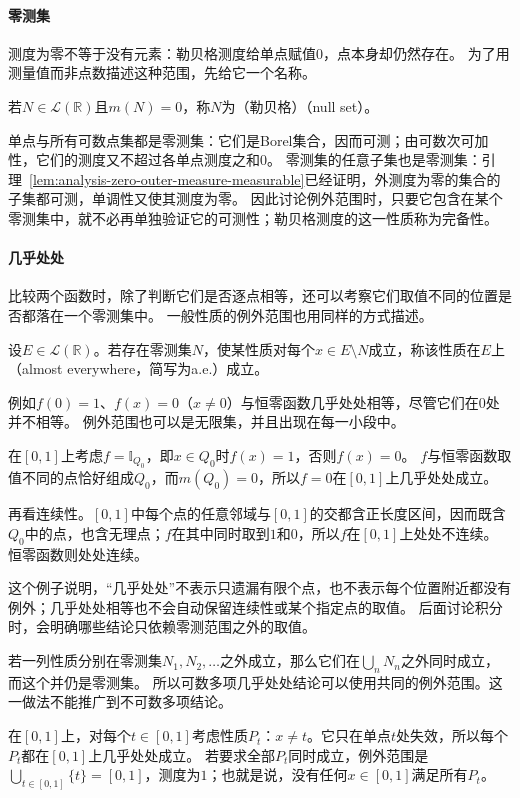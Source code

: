 \paragraph{零测集}

测度为零不等于没有元素：勒贝格测度给单点赋值$0$，点本身却仍然存在。
为了用测量值而非点数描述这种范围，先给它一个名称。
\begin{definition}[零测集]
\label{def:analysis-null-set-almost-everywhere}
若$N\in\mathcal L(\mathbb R)$且$m(N)=0$，称$N$为（勒贝格）（null set）。
\end{definition}
单点与所有可数点集都是零测集：它们是Borel集合，因而可测；由可数次可加性，它们的测度又不超过各单点测度之和$0$。
零测集的任意子集也是零测集：引理~\ref{lem:analysis-zero-outer-measure-measurable}已经证明，外测度为零的集合的子集都可测，单调性又使其测度为零。
因此讨论例外范围时，只要它包含在某个零测集中，就不必再单独验证它的可测性；勒贝格测度的这一性质称为完备性。

\paragraph{几乎处处}

比较两个函数时，除了判断它们是否逐点相等，还可以考察它们取值不同的位置是否都落在一个零测集中。
一般性质的例外范围也用同样的方式描述。
\begin{definition}[几乎处处]
设$E\in\mathcal L(\mathbb R)$。若存在零测集$N$，使某性质对每个$x\in E\setminus N$成立，称该性质在$E$上（almost everywhere，简写为a.e.）成立。
\end{definition}
例如$f(0)=1$、$f(x)=0$（$x\neq0$）与恒零函数几乎处处相等，尽管它们在$0$处并不相等。
例外范围也可以是无限集，并且出现在每一小段中。
\begin{example}[有理点指示函数几乎处处为零]
在$[0,1]$上考虑$f=\mathbb I_{Q_0}$，即$x\in Q_0$时$f(x)=1$，否则$f(x)=0$。
$f$与恒零函数取值不同的点恰好组成$Q_0$，而$m(Q_0)=0$，所以$f=0$在$[0,1]$上几乎处处成立。

再看连续性。$[0,1]$中每个点的任意邻域与$[0,1]$的交都含正长度区间，因而既含$Q_0$中的点，也含无理点；$f$在其中同时取到$1$和$0$，所以$f$在$[0,1]$上处处不连续。
恒零函数则处处连续。
\end{example}

这个例子说明，“几乎处处”不表示只遗漏有限个点，也不表示每个位置附近都没有例外；几乎处处相等也不会自动保留连续性或某个指定点的取值。
后面讨论积分时，会明确哪些结论只依赖零测范围之外的取值。

若一列性质分别在零测集$N_1,N_2,\ldots$之外成立，那么它们在$\bigcup_nN_n$之外同时成立，而这个并仍是零测集。
所以可数多项几乎处处结论可以使用共同的例外范围。这一做法不能推广到不可数多项结论。
\begin{example}[不可数多项几乎处处结论不能合并]
在$[0,1]$上，对每个$t\in[0,1]$考虑性质$P_t$：$x\neq t$。它只在单点$t$处失效，所以每个$P_t$都在$[0,1]$上几乎处处成立。
若要求全部$P_t$同时成立，例外范围是$\bigcup_{t\in[0,1]}\{t\}=[0,1]$，测度为$1$；也就是说，没有任何$x\in[0,1]$满足所有$P_t$。
\end{example}

